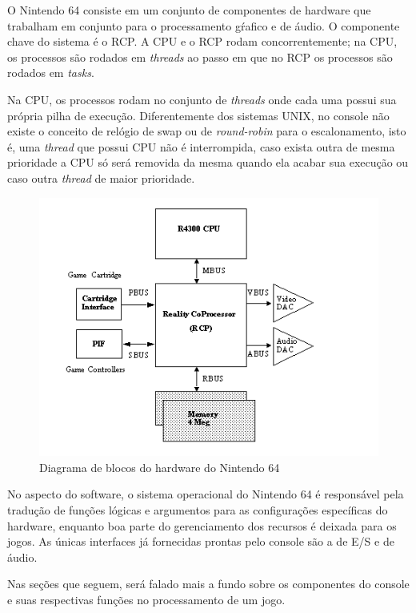 \documentclass[12pt]{article}
\begin{document}
O Nintendo 64 consiste em um conjunto de componentes de hardware que
trabalham em conjunto para o processamento gŕafico e de áudio. O componente
chave do sistema é o RCP. A CPU e o RCP rodam concorrentemente; na CPU, os processos são rodados em \textit{threads} ao passo em que no RCP os processos são rodados em
\textit{tasks}.

Na CPU, os processos rodam no conjunto de \textit{threads} onde cada uma
possui sua própria pilha de execução. Diferentemente dos sistemas UNIX,
no console não existe o conceito de relógio de swap ou de
\textit{round-robin} para o escalonamento, isto é, uma \textit{thread}
que possui CPU não é interrompida, caso exista outra de mesma prioridade
a CPU só será removida da mesma quando ela acabar sua execução ou caso
outra \textit{thread} de maior prioridade.

\begin{figure}[H]
    \label{fig:block-diagram}
    \centering
        \includegraphics[scale=.65]{figures/nintendo64-diagram}
    \caption{Diagrama de blocos do hardware do Nintendo 64}
\end{figure}

No aspecto do software, o sistema operacional do Nintendo 64 é responsável pela tradução de
funções lógicas e argumentos para as configurações específicas
do hardware, enquanto boa parte do gerenciamento dos recursos
é deixada para os jogos. As únicas interfaces já fornecidas prontas
pelo console são a de E/S e de áudio.

Nas seções que seguem, será falado mais a fundo sobre os componentes do
console e suas respectivas funções no processamento de um jogo.
\end{document}
